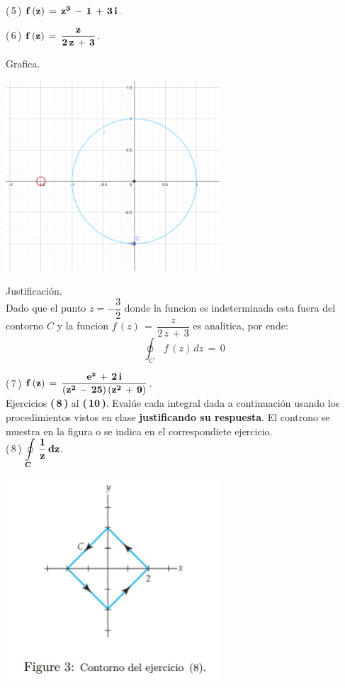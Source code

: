 \documentclass[a4paper,11pt,openany]{book}
\begin{document}
\textcolor{ao(english)}{(\,5\,)} $\bf{f\,(z)\,=\,z^{3}\,-\,1\,+\,3\,i}$.

\textcolor{ao(english)}{(\,6\,)} $\bf{f\,(z)\,=\,\dfrac{z}{2\,z\,+\,3}}$.

\textcolor{ao(english)}{} Grafica.
\begin{center}
     \includegraphics[width=8cm]{Gra-Ej-6.png}
\end{center}


\textcolor{ao(english)}{} Justificación.\\
Dado que el punto $z=-\dfrac{3}{2}$ donde la funcion es indeterminada esta fuera del contorno $C$
y la funcion  $f\,(z)\,=\,\dfrac{z}{2\,z\,+\,3}$ es analitica, por ende:   \\

$$\oint_{C}\,f\,(z)\,dz\,=\,0$$


\textcolor{ao(english)}{(\,7\,)} $\bf{f\,(z)\,=\,\dfrac{e^{z}\,+\,2\,i}{(z^{2}\,-\,25)\,(z^{2}\,+\,9)}}$.\\

Ejercicios \textbf{(\,8\,)} al \textbf{(\,10\,)}. Evalúe cada integral dada a continuación usando los procedimientos vistos en clase \textbf{justificando su respuesta}. El controno se muestra en la figura o se indica en el correspondiete ejercicio.\\

\textcolor{ao(english)}{(\,8\,)} $\bf{\displaystyle\oint\limits_{C}\,\dfrac{1}{z}\,dz}$.

\begin{center}
     \includegraphics[width=8cm]{figura-3.JPG}
\end{center}
\end{document}
